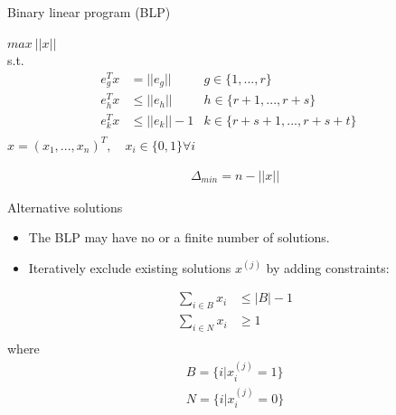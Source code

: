 \documentclass{beamer}
\begin{document}
\begin{frame}{Binary linear program (BLP)}
    
$max ~||x||$ \\
s.t. 
\begin{align*}
    e^{T}_{g} x & =       ||e_{g}||      & g \in \{1, ..., r\}     &~\\
    e^{T}_{h} x & \leq    ||e_{h}||     & h \in \{r+1, ..., r+s\} &~\\
    e^{T}_{k} x & \leq    ||e_{k}||-1  & k \in \{r+s+1, ..., r+s+t\} &~\\
\end{align*}
$x = (x_{1}, ..., x_{n})^{T}, \quad x_{i} \in \{0, 1\} \forall i$

\begin{align*}
    \Delta_{min} = n - ||x||
\end{align*}

\end{frame}

\begin{frame}{Alternative solutions}
\begin{itemize}
    \item The BLP may have no or a finite number of solutions.
    \item Iteratively exclude existing solutions $x^{(j)}$ by adding constraints:
\end{itemize}
    
    \begin{align*}
        \sum_{i \in B} x_i & \leq |B| -1 \\
        \sum_{i \in N} x_i & \geq 1   \\
    \end{align*}
    where 
    \begin{align*}
        B = \{i |x_{i}^{(j)} = 1\} \\
        N = \{i |x_{i}^{(j)} = 0\} \\
    \end{align*}

\end{frame}


\end{document}

